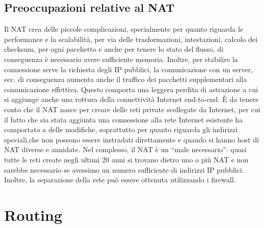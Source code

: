 \subsection{Preoccupazioni relative al NAT}
Il NAT crea delle piccole complicazioni, specialmente per quanto riguarda le performance e la scalabilità, per via delle trasformazioni, intestazioni, calcolo dei checksum, per ogni pacchetto e anche per tenere lo stato del flusso, di conseguenza è necessario avere sufficiente memoria. Inoltre, per stabilire la connessione serve la richiesta degli IP pubblici, la comunicazione con un server, ecc. di conseguenza aumenta anche il traffico dei pacchetti supplementari alla comunicazione effettiva. Questo comporta una leggera perdita di astrazione a cui si aggiunge anche una rottura della connettività Internet end-to-end. È da tenere conto che il NAT nasce per creare delle reti private scollegate da Internet, per cui il fatto che sia stata aggiunta una connessione alla rete Internet esistente ha comportato a delle modifiche, soprattutto per quanto riguarda gli indirizzi speciali,che non possono essere instradati direttamente e quando si hanno host di NAT diverse e annidate. Nel complesso, il NAT è un “male necessario”: quasi tutte le reti create negli ultimi 20 anni si trovano dietro uno o più NAT e non sarebbe necessario se avessimo un numero sufficiente di indirizzi IP pubblici. Inoltre, la separazione della rete può essere ottenuta utilizzando i firewall.
\section{Routing}

